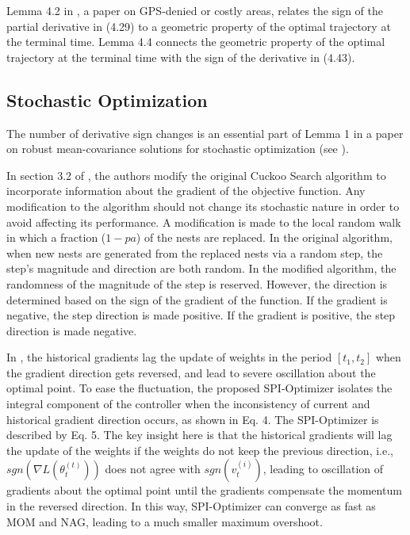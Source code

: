 \documentclass[11pt]{book}
\begin{document}
Lemma 4.2 in \cite{cheng2018reaching}, a paper on GPS-denied or costly areas, relates the sign of the partial
derivative in (4.29) to a geometric property of the optimal trajectory
at the terminal time. Lemma 4.4 connects the geometric property of
the optimal trajectory at the terminal time with the sign of the derivative
in (4.43).


\subsection{Stochastic Optimization}

The number of derivative sign changes is an essential part of Lemma
1 in a paper on robust mean-covariance solutions for stochastic optimization (see \cite{popescu2007robust}).

In section 3.2 of \cite{fateen2014note}, the authors modify the original
Cuckoo Search algorithm to incorporate information about the gradient of the
objective function. Any modification to the algorithm should not change
its stochastic nature in order to avoid affecting its performance. A
modification is made to the local random walk in which a fraction
($1-pa$) of the nests are replaced. In the original algorithm, when
new nests are generated from the replaced nests via a random step,
the step's magnitude and direction are both random. In the modified
algorithm, the randomness of the magnitude of the step is reserved.
However, the direction is determined based on the sign of the gradient
of the function. If the gradient is negative, the step direction is
made positive. If the gradient is positive, the step direction is
made negative.

In \cite{wang2019spi}, the historical gradients lag the update of
weights in the period $\left[t_{1},t_{2}\right]$ when the gradient
direction gets reversed, and lead to severe oscillation about the
optimal point. To ease the fluctuation, the proposed SPI-Optimizer
isolates the integral component of the controller when the inconsistency
of current and historical gradient direction occurs, as shown in Eq. 4.
The SPI-Optimizer is described by Eq. 5. The key insight here
is that the historical gradients will lag the update of the weights if
the weights do not keep the previous direction, i.e., $sgn\left(\nabla L\left(\theta_{t}^{\left(t\right)}\right)\right)$
does not agree with $sgn\left(v_{t}^{\left(i\right)}\right)$, leading
to oscillation of gradients about the optimal point until the gradients
compensate the momentum in the reversed direction. In this way, SPI-Optimizer
can converge as fast as MOM and NAG, leading to a much smaller maximum
overshoot.
\end{document}

